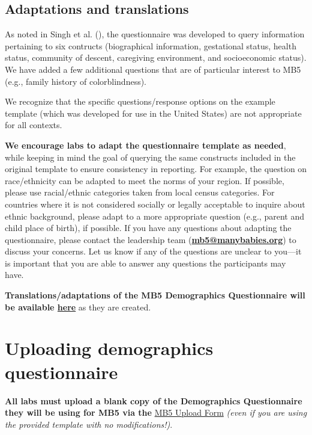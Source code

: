\documentclass[
  letterpaper,
  DIV=11,
  numbers=noendperiod,
  oneside]{scrreprt}
\begin{document}
\subsection{Adaptations and
translations}\label{adaptations-and-translations}

As noted in Singh et al. (), the
questionnaire was developed to query information pertaining to six
contructs (biographical information, gestational status, health status,
community of descent, caregiving environment, and socioeconomic status).
We have added a few additional questions that are of particular interest
to MB5 (e.g., family history of colorblindness).

We recognize that the specific questions/response options on the example
template (which was developed for use in the United States) are not
appropriate for all contexts.

\textbf{We encourage labs to adapt the questionnaire template as
needed}, while keeping in mind the goal of querying the same constructs
included in the original template to ensure consistency in reporting.
For example, the question on race/ethnicity can be adapted to meet the
norms of your region. If possible, please use racial/ethnic categories
taken from local census categories. For countries where it is not
considered socially or legally acceptable to inquire about ethnic
background, please adapt to a more appropriate question (e.g., parent
and child place of birth), if possible. If you have any questions about
adapting the questionnaire, please contact the leadership team
(\href{mailto:mb5@manybabies.org}{\textbf{mb5@manybabies.org}}) to
discuss your concerns. Let us know if any of the questions are unclear
to you---it is important that you are able to answer any questions the
participants may have.

\textbf{Translations/adaptations of the MB5 Demographics Questionnaire
will be available \href{MB5\%20Demographics\%20Questionnaire}{here}} as
they are created.

\section{Uploading demographics
questionnaire}\label{uploading-demographics-questionnaire}

\textbf{All labs must upload a blank copy of the Demographics
Questionnaire they will be using for MB5 via the}
\href{https://airtable.com/appRoqMKzcK3NsXt4/pagPm3MXnFExsz1Ti/form}{MB5
Upload Form} \emph{(even if you are using the provided template with no
modifications!)}.
\end{document}
